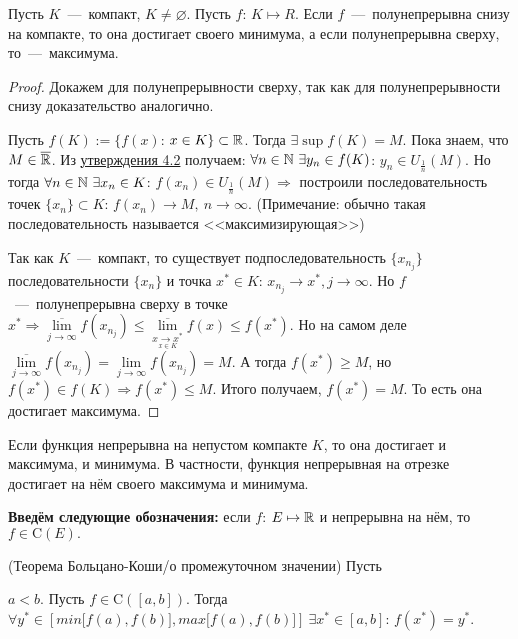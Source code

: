 \begin{theorem}
    Пусть $K$~---~компакт, $K \neq \varnothing$. Пусть $f$: $K \mapsto R$. Если $f$~---~полунепрерывна снизу на компакте, то она достигает своего минимума, а если полунепрерывна сверху, то~---~максимума.
\end{theorem}
\begin{proof}
    Докажем для полунепрерывности сверху, так как для полунепрерывности снизу доказательство аналогично. 
    
    Пусть $f (K) := \{ f (x)$: $x \in K\} \subset \mathbb{R}$. Тогда $\exists \sup f (K) = M.$ Пока знаем, что $M \in \overline{\mathbb{R}}$. Из \hyperlink{prop4.2}{утверждения 4.2} получаем: $\forall n \in \mathbb{N} \  \exists y_{n} \in f (K)$: $y_{n} \in U_{\frac{1}{n}} (M)$. Но тогда $\forall n \in \mathbb{N} \ \exists x_{n} \in K$: $f (x_{n}) \in U_{\frac{1}{n}} (M) \Rightarrow$ построили последовательность точек $\{ x_{n} \} \subset K$: $f (x_{n}) \to M, \ n \to \infty$. (Примечание: обычно такая последовательность называется <<максимизирующая>>)

    Так как $K$~---~компакт, то существует подпоследовательность $\{ x_{n_{j}} \}$ последовательности $\{ x_{n} \}$ и точка $x^{*} \in K$: $x_{n_{j}} \to x^{*}, j \to \infty$. Но $f$~---~полунепрерывна сверху в точке $x^{*} \Rightarrow \overline{\lim\limits_{j\to \infty}} f (x_{n_{j}}) \leq \overline{\lim\limits_{\underset{x \in K}{x\to x^{*}}}} f (x) \leq f (x^{*})$. Но на самом деле $\overline{\lim\limits_{j\to \infty}} f (x_{n_{j}}) = \lim\limits_{j\to \infty} f (x_{n_{j}}) = M.$ А тогда $f (x^{*}) \geq M$, но $f (x^{*}) \in f (K) \Rightarrow f (x^{*}) \leq M.$ Итого получаем, $f (x^{*}) = M$. То есть она достигает максимума.
\end{proof} %
\begin{corollary}
    Если функция непрерывна на непустом компакте $K$, то она достигает и максимума, и минимума. В частности, функция непрерывная на отрезке достигает на нём своего максимума и минимума.
\end{corollary}

\textbf{Введём следующие обозначения:} если $f$: $E \mapsto \mathbb{R}$ и непрерывна на нём, то $f \in \text{C} (E).$

\begin{theorem}
    \hypertarget{thm5.4}{(Теорема Больцано-Коши/о промежуточном значении) Пусть} $a < b$. Пусть $f \in \text{C} ([a, b])$. Тогда $\forall y^{*} \in [min\big[f (a), f (b)\big], max\big[f (a), f (b)\big]]\  \exists x^{*} \in [a, b]$: $f (x^{*}) = y^{*}.$
\end{theorem}

